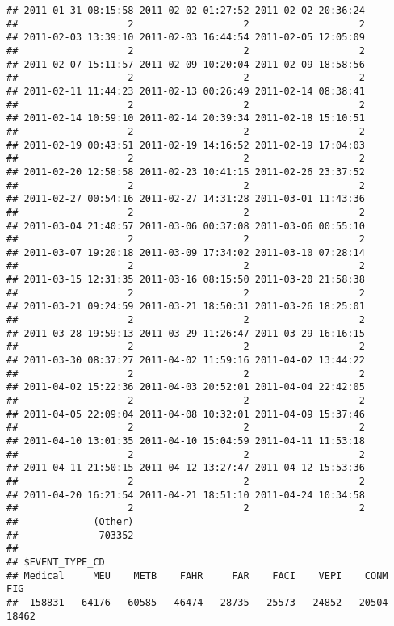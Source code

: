 \documentclass[]{article}
\begin{document}
\begin{verbatim}
## 2011-01-31 08:15:58 2011-02-02 01:27:52 2011-02-02 20:36:24 
##                   2                   2                   2 
## 2011-02-03 13:39:10 2011-02-03 16:44:54 2011-02-05 12:05:09 
##                   2                   2                   2 
## 2011-02-07 15:11:57 2011-02-09 10:20:04 2011-02-09 18:58:56 
##                   2                   2                   2 
## 2011-02-11 11:44:23 2011-02-13 00:26:49 2011-02-14 08:38:41 
##                   2                   2                   2 
## 2011-02-14 10:59:10 2011-02-14 20:39:34 2011-02-18 15:10:51 
##                   2                   2                   2 
## 2011-02-19 00:43:51 2011-02-19 14:16:52 2011-02-19 17:04:03 
##                   2                   2                   2 
## 2011-02-20 12:58:58 2011-02-23 10:41:15 2011-02-26 23:37:52 
##                   2                   2                   2 
## 2011-02-27 00:54:16 2011-02-27 14:31:28 2011-03-01 11:43:36 
##                   2                   2                   2 
## 2011-03-04 21:40:57 2011-03-06 00:37:08 2011-03-06 00:55:10 
##                   2                   2                   2 
## 2011-03-07 19:20:18 2011-03-09 17:34:02 2011-03-10 07:28:14 
##                   2                   2                   2 
## 2011-03-15 12:31:35 2011-03-16 08:15:50 2011-03-20 21:58:38 
##                   2                   2                   2 
## 2011-03-21 09:24:59 2011-03-21 18:50:31 2011-03-26 18:25:01 
##                   2                   2                   2 
## 2011-03-28 19:59:13 2011-03-29 11:26:47 2011-03-29 16:16:15 
##                   2                   2                   2 
## 2011-03-30 08:37:27 2011-04-02 11:59:16 2011-04-02 13:44:22 
##                   2                   2                   2 
## 2011-04-02 15:22:36 2011-04-03 20:52:01 2011-04-04 22:42:05 
##                   2                   2                   2 
## 2011-04-05 22:09:04 2011-04-08 10:32:01 2011-04-09 15:37:46 
##                   2                   2                   2 
## 2011-04-10 13:01:35 2011-04-10 15:04:59 2011-04-11 11:53:18 
##                   2                   2                   2 
## 2011-04-11 21:50:15 2011-04-12 13:27:47 2011-04-12 15:53:36 
##                   2                   2                   2 
## 2011-04-20 16:21:54 2011-04-21 18:51:10 2011-04-24 10:34:58 
##                   2                   2                   2 
##             (Other) 
##              703352 
## 
## $EVENT_TYPE_CD
## Medical     MEU    METB    FAHR     FAR    FACI    VEPI    CONM     FIG 
##  158831   64176   60585   46474   28735   25573   24852   20504   18462 

\end{verbatim}
\end{document}
